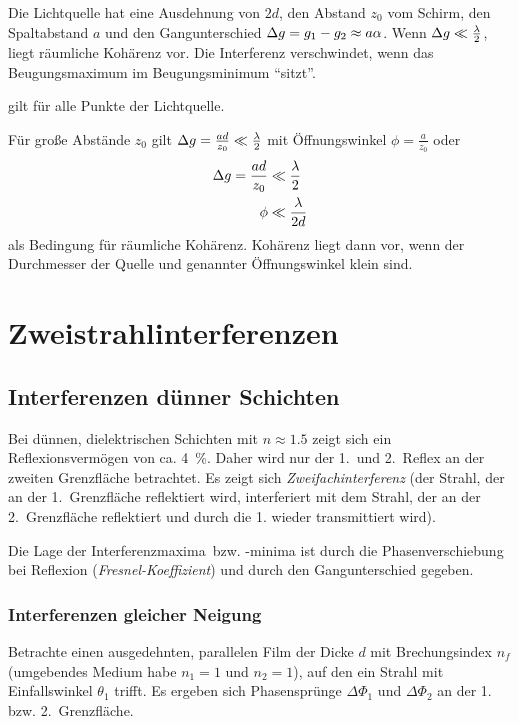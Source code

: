 Die Lichtquelle hat eine Ausdehnung von $2d$, den Abstand $z_0$ vom Schirm,
den Spaltabstand $a$ und den Gangunterschied $\Delta g=g_1-g_2\approx a\alpha$.
Wenn $\Delta g\ll\frac{\lambda}{2}$, liegt räumliche Kohärenz vor. Die
Interferenz verschwindet, wenn das Beugungsmaximum im Beugungsminimum
\enquote{sitzt}.

 gilt für alle Punkte der Lichtquelle.

Für große Abstände $z_0$ gilt $\Delta g=\frac{ad}{z_0}\ll\frac{\lambda}{2}$
mit Öffnungswinkel $\phi=\frac{a}{z_0}$ oder
\begin{align*}
  \Delta g = \frac{ad}{z_0} &\ll \frac{\lambda}{2}\\
  \phi &\ll \frac{\lambda}{2d}
\end{align*}
als Bedingung für räumliche Kohärenz. Kohärenz liegt dann vor, wenn
der Durchmesser der Quelle und genannter Öffnungswinkel klein sind.


\section{Zweistrahlinterferenzen}
\subsection{Interferenzen dünner Schichten}
Bei dünnen, dielektrischen Schichten mit $n\approx\num{1.5}$ zeigt
sich ein Reflexionsvermögen von ca. \SI{4}{\percent}.
Daher wird nur der 1.~und 2.~Reflex an der zweiten Grenzfläche
betrachtet. Es zeigt sich \emph{Zweifachinterferenz} (der Strahl, der an der
1.~Grenzfläche reflektiert wird, interferiert mit dem Strahl, der an der
2.~Grenzfläche reflektiert und durch die 1. wieder transmittiert wird).

Die Lage der Interferenzmaxima~bzw. -minima ist durch die
Phasenverschiebung bei Reflexion
(\emph{Fresnel-Koeffizient}) und durch den
Gangunterschied gegeben.


\subsubsection{Interferenzen gleicher Neigung}
Betrachte einen ausgedehnten, parallelen Film der Dicke
$d$ mit Brechungsindex
$n_f$ (umgebendes Medium habe $n_1=1$ und $n_2=1$), auf den ein Strahl mit
Einfallswinkel $\theta_1$ trifft. 
Es ergeben sich Phasensprünge $\Delta\Phi_1$ und $\Delta\Phi_2$ an der
1.~ bzw. 2.~Grenzfläche.

